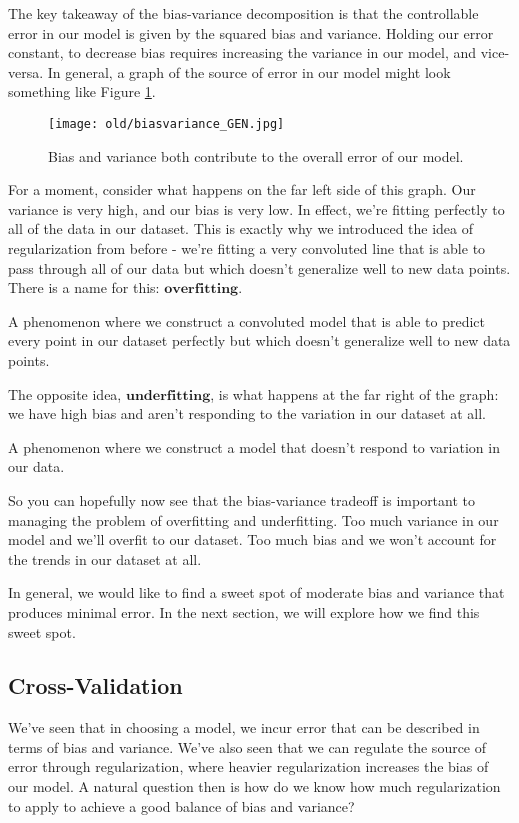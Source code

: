 \newpage
The key takeaway of the bias-variance decomposition is that the controllable error in our model is given by the squared bias and variance. Holding our error constant, to decrease bias requires increasing the variance in our model, and vice-versa. In general, a graph of the source of error in our model might look something like Figure \ref{fig:bias-vs-variance}.

\begin{figure}
    \centering
    \texttt{[image: old/biasvariance\_GEN.jpg]}
    \caption{Bias and variance both contribute to the overall error of our model.}
    \label{fig:bias-vs-variance}
\end{figure}

For a moment, consider what happens on the far left side of this graph. Our variance is very high, and our bias is very low. In effect, we're fitting perfectly to all of the data in our dataset. This is exactly why we introduced the idea of regularization from before - we're fitting a very convoluted line that is able to pass through all of our data but which doesn't generalize well to new data points. There is a name for this: $\bm{overfitting}$.

\begin{definition}[overfitting]
    A phenomenon where we construct a convoluted model that is able to predict every point in our dataset perfectly but which doesn't generalize well to new data points.
\end{definition}

The opposite idea, $\bm{underfitting}$, is what happens at the far right of the graph: we have high bias and aren't responding to the variation in our dataset at all.

\begin{definition}[underfitting]
    A phenomenon where we construct a model that doesn't respond to variation in our data.
\end{definition}

So you can hopefully now see that the bias-variance tradeoff is important to managing the problem of overfitting and underfitting. Too much variance in our model and we'll overfit to our dataset. Too much bias and we won't account for the trends in our dataset at all.

In general, we would like to find a sweet spot of moderate bias and variance that produces minimal error. In the next section, we will explore how we find this sweet spot.

\subsection{Cross-Validation}
We've seen that in choosing a model, we incur error that can be described in terms of bias and variance. We've also seen that we can regulate the source of error through regularization, where heavier regularization increases the bias of our model. A natural question then is how do we know how much regularization to apply to achieve a good balance of bias and variance?

